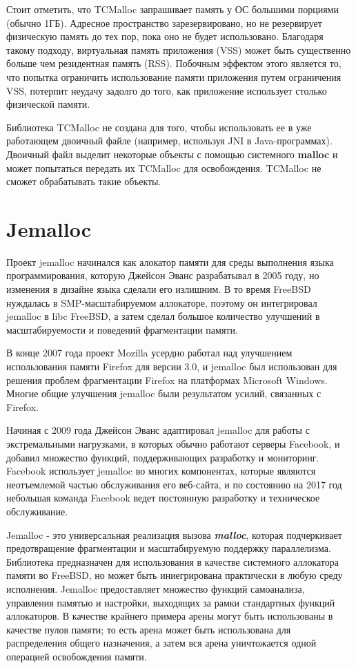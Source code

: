Стоит отметить, что TCMalloc запрашивает память у ОС большими порциями (обычно 1ГБ). Адресное пространство зарезервировано, но не резервирует физическую память до тех пор, пока оно не будет использовано. Благодаря такому подходу, виртуальная память приложения (VSS) может быть существенно больше чем резидентная память (RSS). Побочным эффектом этого является то, что попытка ограничить использование памяти приложения путем ограничения VSS, потерпит неудачу задолго до того, как приложение использует столько физической памяти.

Библиотека TCMalloc не создана для того, чтобы использовать ее в уже работающем двоичный файле (например, используя JNI в Java-программах). Двоичный файл выделит некоторые объекты с помощью системного \textbf{malloc} и может попытаться передать их TCMalloc для освобождения. TCMalloc не сможет обрабатывать такие объекты.

\section{Jemalloc}
Проект jemalloc начинался как алокатор памяти для среды выполнения языка программирования, которую Джейсон Эванс разрабатывал в 2005 году, но изменения в дизайне языка сделали его излишним. В то время FreeBSD нуждалась в SMP-масштабируемом аллокаторе, поэтому он интегрировал jemalloc в libc FreeBSD, а затем сделал большое количество улучшений в масштабируемости и поведений фрагментации памяти.

В конце 2007 года проект Mozilla усердно работал над улучшением использования памяти Firefox для версии 3.0, и jemalloc был использован для решения проблем фрагментации Firefox на платформах Microsoft Windows. Многие общие улучшения jemalloc были результатом усилий, связанных с Firefox.

Начиная с 2009 года Джейсон Эванс адаптировал jemalloc для работы с экстремальными нагрузками, в которых обычно работают серверы Facebook, и добавил множество функций, поддерживающих разработку и мониторинг. Facebook использует jemalloc во многих компонентах, которые являются неотъемлемой частью обслуживания его веб-сайта, и по состоянию на 2017 год небольшая команда Facebook ведет постоянную разработку и техническое обслуживание.

Jemalloc - это универсальная реализация вызова \textit{\textbf{malloc}}, которая подчеркивает предотвращение фрагментации и масштабируемую поддержку параллелизма. Библиотека предназначен для использования в качестве системного аллокатора памяти во FreeBSD, но может быть иниегрирована практически в любую среду исполнения. Jemalloc предоставляет множество функций самоанализа, управления памятью и настройки, выходящих за рамки стандартных функций аллокаторов. В качестве крайнего примера арены могут быть использованы в качестве пулов памяти; то есть арена может быть использована для распределения общего назначения, а затем вся арена уничтожается одной операцией освобождения памяти.\cite{jemalloc}

